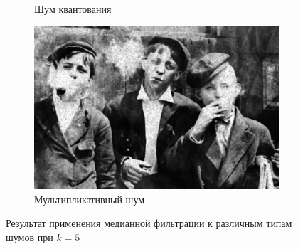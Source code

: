 \begin{figure}[ht!]
\begin{subfigure}[b]{0.5\linewidth}
      \caption{Шум квантования} 
      \label{median_5:e}
    \end{subfigure}%
    \begin{subfigure}[b]{0.5\linewidth}
        \centering
        \includegraphics[width=0.95\linewidth]{../Median_FIlter/Median_Speckle_noise_(k=5).jpg} 
        \caption{Мультипликативный шум} 
        \label{median_5:f} 
    \end{subfigure} 
    \caption{Результат применения медианной фильтрации к различным типам шумов при $k = 5$}
    \label{img:median_5} 
\end{figure}

